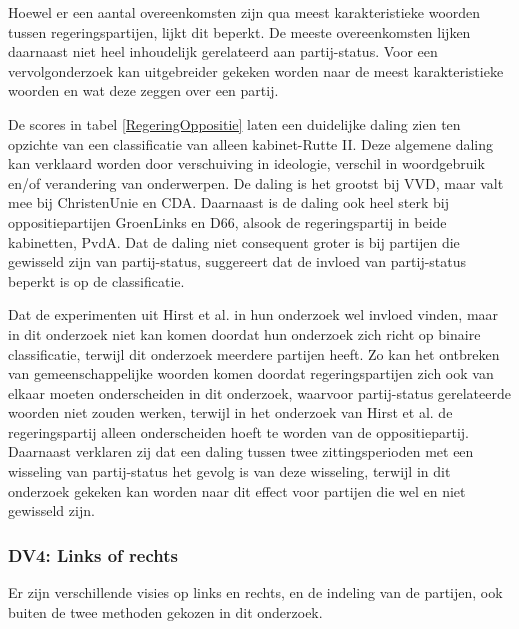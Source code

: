Hoewel er een aantal overeenkomsten zijn qua meest karakteristieke woorden tussen regeringspartijen, lijkt dit beperkt. De meeste overeenkomsten lijken daarnaast niet heel inhoudelijk gerelateerd aan partij-status. Voor een vervolgonderzoek kan uitgebreider gekeken worden naar de meest karakteristieke woorden en wat deze zeggen over een partij.\par
De scores in tabel \ref{RegeringOppositie} laten een duidelijke daling zien ten opzichte van een classificatie van alleen kabinet-Rutte II. Deze algemene daling kan verklaard worden door verschuiving in ideologie, verschil in woordgebruik en/of verandering van onderwerpen. De daling is het grootst bij VVD, maar valt mee bij ChristenUnie en CDA. Daarnaast is de daling ook heel sterk bij oppositiepartijen GroenLinks en D66, alsook de regeringspartij in beide kabinetten, PvdA. Dat de daling niet consequent groter is bij partijen die gewisseld zijn van partij-status, suggereert dat de invloed van partij-status beperkt is op de classificatie.\par
Dat de experimenten uit Hirst et al. in hun onderzoek wel invloed vinden, maar in dit onderzoek niet kan komen doordat hun onderzoek zich richt op binaire classificatie, terwijl dit onderzoek meerdere partijen heeft. Zo kan het ontbreken van gemeenschappelijke woorden komen doordat regeringspartijen zich ook van elkaar moeten onderscheiden in dit onderzoek, waarvoor partij-status gerelateerde woorden niet zouden werken, terwijl in het onderzoek van Hirst et al. de regeringspartij alleen onderscheiden hoeft te worden van de oppositiepartij. Daarnaast verklaren zij dat een daling tussen twee zittingsperioden met een wisseling van partij-status het gevolg is van deze wisseling, terwijl in dit onderzoek gekeken kan worden naar dit effect voor partijen die wel en niet gewisseld zijn.\par

\subsubsection{DV4: Links of rechts}
Er zijn verschillende visies op links en rechts, en de indeling van de partijen, ook buiten de twee methoden gekozen in dit onderzoek.\par

